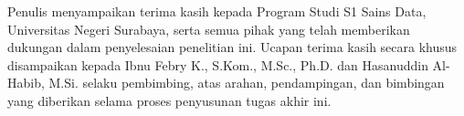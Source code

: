 \documentclass{rapidsart}
\theoremstyle{plain}
\theoremstyle{remark}
\theoremstyle{definition}
\begin{document}
\begin{acknowledgement}[title={Ucapan Terima Kasih}]
    Penulis menyampaikan terima kasih kepada Program Studi S1 Sains Data, Universitas Negeri Surabaya, serta semua pihak yang telah memberikan dukungan dalam penyelesaian penelitian ini. Ucapan terima kasih secara khusus disampaikan kepada Ibnu Febry K., S.Kom., M.Sc., Ph.D. dan Hasanuddin Al-Habib, M.Si. selaku pembimbing, atas arahan, pendampingan, dan bimbingan yang diberikan selama proses penyusunan tugas akhir ini.
\end{acknowledgement}



\end{document}
